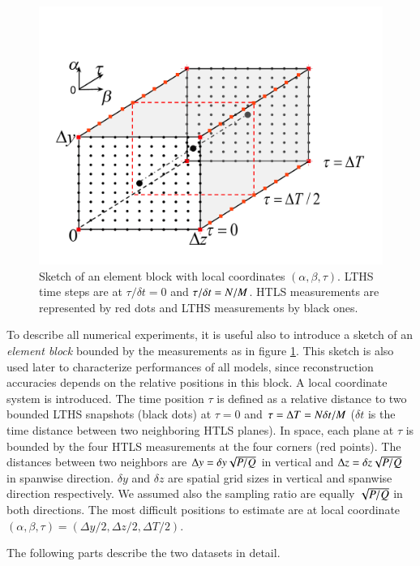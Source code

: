 \begin{figure}[t]
\centering
	\includegraphics[width=0.6\columnwidth]{./images/probdef/setups/element_block.pdf}
	\caption{\label{fig:element_block} Sketch of an element block with local coordinates $ (\alpha,\beta,\tau) $. LTHS time steps are at $ \tau/\delta t=0 $ and $ \tau/\delta t=N/M $. HTLS measurements are represented by red dots and LTHS measurements by black ones. }
\end{figure}

To describe all numerical experiments, it is useful also to introduce a sketch of an \textit{element block} bounded by the measurements as in figure \ref{fig:element_block}. This sketch is also used later to characterize performances of all models, since reconstruction accuracies depends on the relative positions in this block. A local coordinate system is introduced. The time position $ \tau $ is defined as a relative distance to two bounded LTHS snapshots (black dots) at $ \tau =0 $ and $ \tau = \Delta T = N\delta t/M  $ ($ \delta t $ is the time distance between two neighboring HTLS planes). In space, each plane at $ \tau $ is bounded by the four HTLS measurements at the four corners (red points). The distances between two neighbors are $ \Delta y  = \delta y\sqrt{P/Q} $ in vertical and $ \Delta z = \delta z\sqrt{P/Q} $ in spanwise direction. $ \delta y $ and $ \delta z $ are spatial grid sizes in vertical and spanwise direction respectively. We assumed also the sampling ratio are equally $ \sqrt{P/Q} $ in both directions. The most difficult positions to estimate are at local coordinate $ (\alpha, \beta, \tau) = (\Delta y/2,\Delta z/2,\Delta T/2)  $.

The following parts describe the two datasets in detail.

